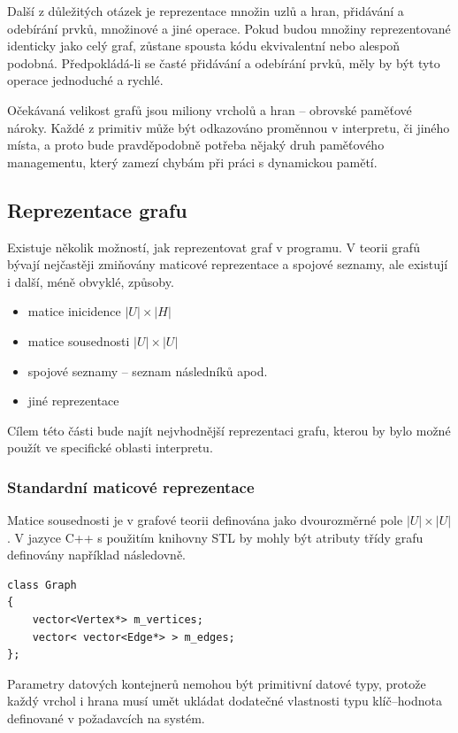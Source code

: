 \documentclass[11pt,twoside,a4paper]{book}
\begin{document}
Další z důležitých otázek je reprezentace množin uzlů a hran, přidávání a odebírání prvků, množinové a jiné operace. Pokud budou množiny reprezentované identicky jako celý graf, zůstane spousta kódu ekvivalentní nebo alespoň podobná. Předpokládá-li se časté přidávání a odebírání prvků, měly by být tyto operace jednoduché a rychlé.

Očekávaná velikost grafů jsou miliony vrcholů a hran -- ob\-rov\-ské pa\-mě\-ťo\-vé nároky. Každé z primitiv může být odkazováno proměnnou v interpretu, či jiného místa, a proto bude pravděpodobně potřeba nějaký druh paměťového managementu, který zamezí chybám při práci s dynamickou pamětí.


\subsection{Reprezentace grafu}

Existuje několik možností, jak reprezentovat graf v programu. V teorii grafů bývají nejčastěji zmi\-ňo\-vá\-ny maticové reprezentace a spojové seznamy, ale existují i další, méně obvyklé, způsoby.

\begin{itemize}
\item matice inicidence $|U| \times |H|$
\item matice sousednosti $|U| \times |U|$
\item spojové seznamy -- seznam následníků apod.
\item jiné reprezentace
\end{itemize}

Cílem této části bude najít nejvhodnější reprezentaci grafu, kterou by bylo možné použít ve specifické oblasti interpretu.


\subsubsection{Standardní maticové reprezentace}

Matice sousednosti je v grafové teorii definována jako dvourozměrné pole $|U| \times |U|$. V jazyce C++ s použitím knihovny STL by mohly být atributy třídy grafu definovány například následovně.

\begin{verbatim}
class Graph
{
    vector<Vertex*> m_vertices;
    vector< vector<Edge*> > m_edges;
};
\end{verbatim}

Parametry datových kontejnerů nemohou být primitivní datové typy, protože každý vrchol i hrana musí umět ukládat dodatečné vlastnosti typu klíč--hodnota definované v požadavcích na systém.
\end{document}
